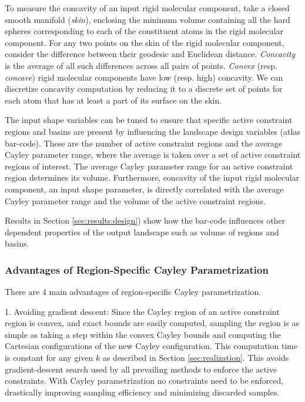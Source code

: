 \documentclass[]{article}
\newcommand{\rmc}{rigid molecular component}
\begin{document}
To measure the concavity of an input \rmc, take a closed smooth manifold
(\emph{skin}), enclosing the minimum volume containing all the hard spheres
corresponding to each of the constituent atoms in the \rmc. For any two
points on the skin of the \rmc, consider the difference between their geodesic
and Euclidean distance. \emph{Concavity} is the average of all such differences
across all pairs of points. \emph{Convex} (resp. \emph{concave}) \rmc s have
low (resp. high) concavity. We can discretize concavity computation by
reducing it to a discrete set of points for each atom that has at least a part
of its surface on the skin.

The input shape variables can be tuned to ensure that specific active
constraint regions and basins are present by influencing the landscape design
variables (atlas bar-code). These are the number of active constraint regions
and the average Cayley parameter range, where the average
is taken over a set of active constraint regions of interest.  The average
Cayley parameter range for an active constraint region determines its volume.
Furthermore, concavity of the input \rmc, an input shape parameter, is directly
correlated with the average Cayley parameter range and the volume of the active
constraint regions. 

Results in Section \ref{sec:results:design}) show how the bar-code influences
other dependent properties of the output landscape such as volume of regions
and basins. 



\subsubsection{Advantages of Region-Specific Cayley Parametrization}
\label{sec:boundaryDetection}
There are 4 main advantages of region-specific Cayley parametrization.

1. Avoiding gradient descent: Since the Cayley region of an active constraint
region is convex, and exact bounds are easily computed, sampling the region
is as simple as taking a step within the convex Cayley bounds and computing the
Cartesian configurations of the new Cayley configuration. This computation
time is constant for any given $k$ as described in Section
\ref{sec:realization}. This avoids gradient-descent search used by all
prevailing methods to enforce the active constraints. With Cayley
parametrization no constraints need to be enforced, drastically improving
sampling efficiency and minimizing discarded samples.
\end{document}
